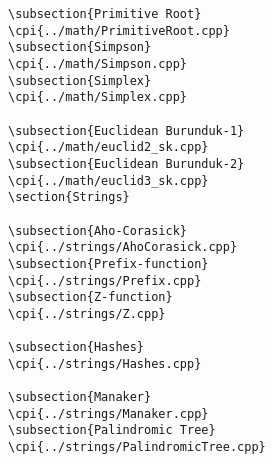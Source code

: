 {\begin{verbatim}
\subsection{Primitive Root}
\cpi{../math/PrimitiveRoot.cpp}
\subsection{Simpson}
\cpi{../math/Simpson.cpp}
\subsection{Simplex}
\cpi{../math/Simplex.cpp}

\subsection{Euclidean Burunduk-1}
\cpi{../math/euclid2_sk.cpp}
\subsection{Euclidean Burunduk-2}
\cpi{../math/euclid3_sk.cpp}
\section{Strings}

\subsection{Aho-Corasick}
\cpi{../strings/AhoCorasick.cpp}
\subsection{Prefix-function}
\cpi{../strings/Prefix.cpp}
\subsection{Z-function}
\cpi{../strings/Z.cpp}

\subsection{Hashes}
\cpi{../strings/Hashes.cpp}

\subsection{Manaker}
\cpi{../strings/Manaker.cpp}
\subsection{Palindromic Tree}
\cpi{../strings/PalindromicTree.cpp}


\end{verbatim}}

